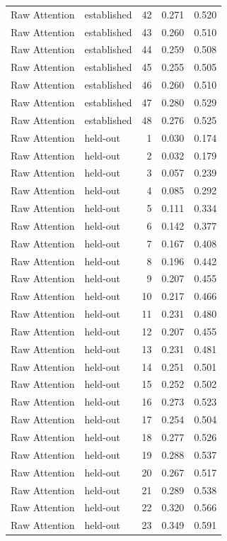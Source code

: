 \begin{tabular}{llrrr}
Raw Attention & established & 42 & 0.271 & 0.520 \\
Raw Attention & established & 43 & 0.260 & 0.510 \\
Raw Attention & established & 44 & 0.259 & 0.508 \\
Raw Attention & established & 45 & 0.255 & 0.505 \\
Raw Attention & established & 46 & 0.260 & 0.510 \\
Raw Attention & established & 47 & 0.280 & 0.529 \\
Raw Attention & established & 48 & 0.276 & 0.525 \\
Raw Attention & held-out & 1 & 0.030 & 0.174 \\
Raw Attention & held-out & 2 & 0.032 & 0.179 \\
Raw Attention & held-out & 3 & 0.057 & 0.239 \\
Raw Attention & held-out & 4 & 0.085 & 0.292 \\
Raw Attention & held-out & 5 & 0.111 & 0.334 \\
Raw Attention & held-out & 6 & 0.142 & 0.377 \\
Raw Attention & held-out & 7 & 0.167 & 0.408 \\
Raw Attention & held-out & 8 & 0.196 & 0.442 \\
Raw Attention & held-out & 9 & 0.207 & 0.455 \\
Raw Attention & held-out & 10 & 0.217 & 0.466 \\
Raw Attention & held-out & 11 & 0.231 & 0.480 \\
Raw Attention & held-out & 12 & 0.207 & 0.455 \\
Raw Attention & held-out & 13 & 0.231 & 0.481 \\
Raw Attention & held-out & 14 & 0.251 & 0.501 \\
Raw Attention & held-out & 15 & 0.252 & 0.502 \\
Raw Attention & held-out & 16 & 0.273 & 0.523 \\
Raw Attention & held-out & 17 & 0.254 & 0.504 \\
Raw Attention & held-out & 18 & 0.277 & 0.526 \\
Raw Attention & held-out & 19 & 0.288 & 0.537 \\
Raw Attention & held-out & 20 & 0.267 & 0.517 \\
Raw Attention & held-out & 21 & 0.289 & 0.538 \\
Raw Attention & held-out & 22 & 0.320 & 0.566 \\
Raw Attention & held-out & 23 & 0.349 & 0.591 \\

\end{tabular}
